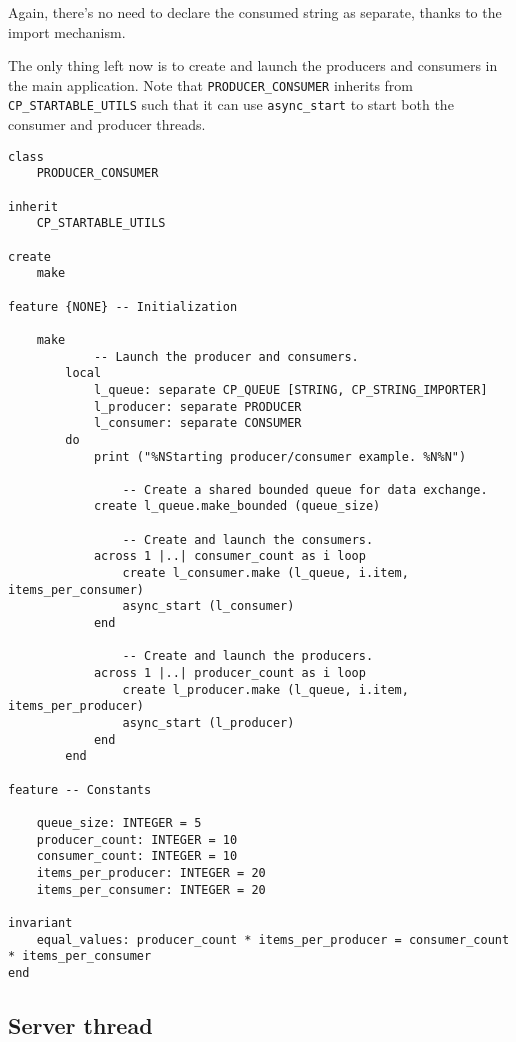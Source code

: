 Again, there's no need to declare the consumed string as separate, thanks to the import mechanism.


The only thing left now is to create and launch the producers and consumers in the main application.
Note that \lstinline!PRODUCER_CONSUMER! inherits from \lstinline!CP_STARTABLE_UTILS! such that it can use \lstinline!async_start! to start both the consumer and producer threads.

\begin{lstlisting}[language=OOSC2Eiffel, captionpos=b, caption={The producer / consumer application root class.}]
class
	PRODUCER_CONSUMER

inherit
	CP_STARTABLE_UTILS

create
	make

feature {NONE} -- Initialization

	make
			-- Launch the producer and consumers.
		local
			l_queue: separate CP_QUEUE [STRING, CP_STRING_IMPORTER]
			l_producer: separate PRODUCER
			l_consumer: separate CONSUMER
		do
			print ("%NStarting producer/consumer example. %N%N")

				-- Create a shared bounded queue for data exchange.
			create l_queue.make_bounded (queue_size)

				-- Create and launch the consumers.
			across 1 |..| consumer_count as i loop
				create l_consumer.make (l_queue, i.item, items_per_consumer)
				async_start (l_consumer)
			end

				-- Create and launch the producers.
			across 1 |..| producer_count as i loop
				create l_producer.make (l_queue, i.item, items_per_producer)
				async_start (l_producer)
			end
		end

feature -- Constants

	queue_size: INTEGER = 5
	producer_count: INTEGER = 10
	consumer_count: INTEGER = 10
	items_per_producer: INTEGER = 20
	items_per_consumer: INTEGER = 20

invariant
	equal_values: producer_count * items_per_producer = consumer_count * items_per_consumer
end
\end{lstlisting}

\subsection{Server thread}
\label{sec:echo-server}

